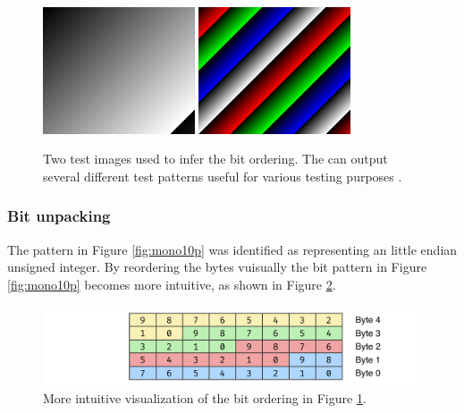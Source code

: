 \begin{figure}[H]
    \centering
    \includegraphics[width=0.4\textwidth]{figures/unpacking/test_pattern0.jpg}
    \includegraphics[width=0.4\textwidth]{figures/unpacking/test_pattern2.jpg}
    \caption{Two test images used to infer the bit ordering.
        The \cam can output several different test patterns useful for various testing purposes \cite{lucidvisionlabsTritonMPPolarized2020}.}
    \label{fig:test_pattern}
\end{figure}


\subsubsection{Bit unpacking} \label{sec:contuguous_access}
The pattern in Figure \ref{fig:mono10p} was identified as representing an little endian unsigned integer.
By reordering the bytes vuisually the bit pattern in Figure \ref{fig:mono10p} becomes more intuitive, as shown in Figure \ref{fig:mono10p_reordered}.

\begin{figure}[H]
    \centering
    \includegraphics[width=\textwidth]{figures/unpacking/layout_10p_be.pdf}
    \caption{More intuitive visualization of the bit ordering in Figure \ref{fig:test_pattern}.}
    \label{fig:mono10p_reordered}
\end{figure}

